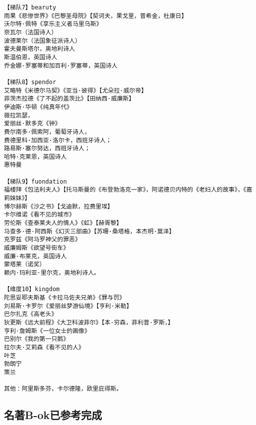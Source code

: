 \documentclass[UTF8]{../RepresentationUniverse}
\begin{document}
\begin{lstlisting}
【梯队7】bearuty
雨果《悲惨世界》《巴黎圣母院》【契诃夫，果戈里，普希金，杜康日】
沃尔特·佩特《享乐主义者马里乌斯》
奈瓦尔（法国诗人）
波德莱尔（法国象征派诗人）
霍夫曼斯塔尔，奥地利诗人
斯温伯恩，英国诗人
乔金娜·罗塞蒂和加百利·罗塞蒂，英国诗人

【梯队8】spendor
艾略特《米德尔马契》《亚当·彼得》【尤朵拉·威尔帝】
菲茨杰拉德《了不起的盖茨比》【田纳西·威廉斯】
伊迪斯·华顿《纯真年代》
薇拉凯瑟，
爱丽丝·默多克《钟》
费尔南多·佩索阿，葡萄牙诗人，
费德里科·加西亚·洛尔卡，西班牙诗人；
路易斯·塞尔努达，西班牙诗人；
哈特·克莱恩，英国诗人
惠特曼

【梯队9】fuondation
福楼拜《包法利夫人》【托马斯曼的《布登勃洛克一家》，阿诺德贝内特的《老妇人的故事》，《嘉莉妹妹》】
博尔赫斯《沙之书》【戈迪默，拉费里埃】
卡尔维诺《看不见的城市》
劳伦斯《查泰莱夫人的情人》《虹》【赫胥黎】
马查多·德·阿西斯《幻灭三部曲》【苏珊·桑塔格，本杰明·莫泽】
克罗兹《阿马罗神父的罪恶》
威廉姆斯《欲望号街车》
威廉·布莱克，英国诗人
蒙塔莱（诺奖）
赖内·玛利亚·里尔克，奥地利诗人。

【维度10】kingdom
陀思妥耶夫斯基《卡拉马佐夫兄弟》《罪与罚》
刘易斯·卡罗尔《爱丽丝梦游仙境》【亨利·米勒】
巴尔扎克《高老头》
狄更斯《远大前程》《大卫科波菲尔》【本·穷森，菲利普·罗斯，】
亨利·詹姆斯《一位女士的画像》
巴别尔《我的第一只鹅》
拉尔夫·艾莉森《看不见的人》
叶芝
勃朗宁
策兰

其他：阿里斯多芬，卡尔德隆，欧里庇得斯。
\end{lstlisting}


\subsection{名著B-ok已参考完成}
\end{document}
